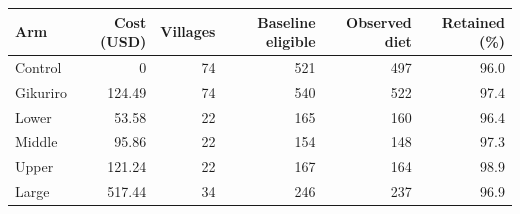 \begin{tabular}{lrrrrr}
\toprule
Arm & Cost (USD) & Villages & Baseline eligible & Observed diet & Retained (\%) \\
\midrule
Control & 0 & 74 & 521 & 497 & 96.0 \\
Gikuriro & 124.49 & 74 & 540 & 522 & 97.4 \\
Lower & 53.58 & 22 & 165 & 160 & 96.4 \\
Middle & 95.86 & 22 & 154 & 148 & 97.3 \\
Upper & 121.24 & 22 & 167 & 164 & 98.9 \\
Large & 517.44 & 34 & 246 & 237 & 96.9 \\
\bottomrule
\end{tabular}
